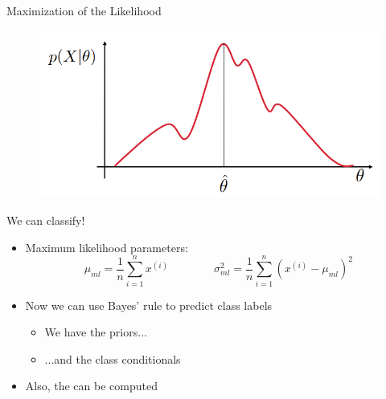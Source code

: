 \begin{frame}{Maximization of the Likelihood}{}
	\begin{figure}
		\centering
		\includegraphics[scale=0.55]{04_density_estimation/02_img/maximum_likelihood}
	\end{figure}
\end{frame}


\begin{frame}{We can classify!}{}
	\begin{itemize}
		\item Maximum likelihood parameters:
		\begin{equation*}
			\mu_{ml} =  \frac{1}{n} \sum_{i=1}^n x^{(i)}
			\qquad\qquad
			\sigma_{ml}^2 = \frac{1}{n} \sum_{i=1}^n (x^{(i)} - \mu_{ml})^2
		\end{equation*}
		\item Now we can use Bayes' rule to predict class labels
		\begin{itemize}
			\item We have the priors...
			\item ...and the class conditionals
		\end{itemize}
		\item Also, the  can be computed
	\end{itemize}
\end{frame}


